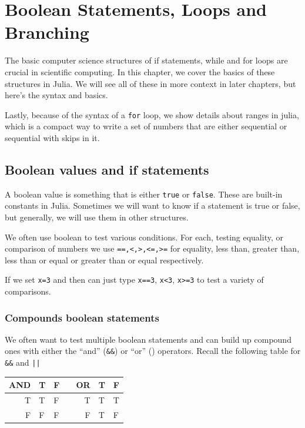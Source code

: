 
\hypertarget{ch:boolean-loops}{%
\chapter{Boolean Statements, Loops and Branching}
\label{ch:boolean-loops}}

The basic computer science structures of if statements, while and for
loops are crucial in scientific computing. In this chapter, we cover the
basics of these structures in Julia. We will see all of these in more
context in later chapters, but here's the syntax and basics.

Lastly, because of the syntax of a \texttt{for} loop, we show details about ranges in julia, which is a compact way to write a set of numbers that are either sequential or sequential with skips in it.  


\section{Boolean values and if statements}

A boolean value is something that is either \texttt{true} or
\texttt{false}. These are built-in constants in Julia. Sometimes we will
want to know if a statement is true or false, but generally, we will use
them in other structures.

We often use boolean to test various conditions. For each, testing
equality, or comparison of numbers we use
\texttt{==,\textless{},\textgreater{},\textless{}=,\textgreater{}=} for equality, less than, greater than, less than or equal or greater than or equal respectively. 

If we set \texttt{x=3} and then can just type \texttt{x==3},
\texttt{x\textless{}3}, \texttt{x\textgreater{}=3} to test a variety of
comparisons.


\subsection{Compounds boolean statements}

We often want to test multiple boolean statements and can build up
compound ones with either the ``and'' (\texttt{\&\&}) or ``or''
(\texttt{\textbar{}\textbar{}}) operators. Recall the following table for \verb!&&! and \verb!||!
\begin{longtable}{@{}rlllrll@{}} \\
\toprule
AND & T & F & & OR & T & F \\
\midrule
\endhead
T & T & F & & T & T & T \\
F & F & F & & F & T & F \\
\bottomrule
\end{longtable}



